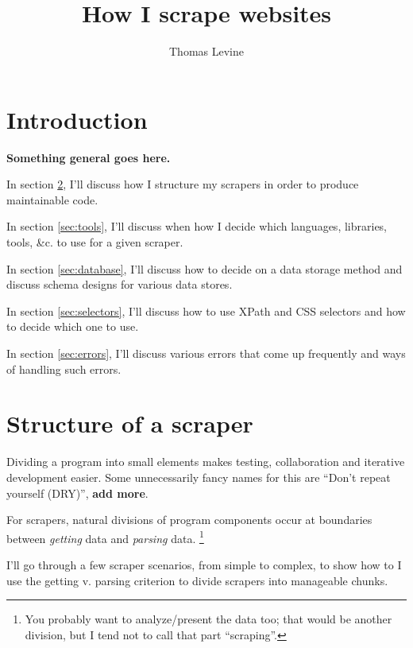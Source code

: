 \documentclass{article}
\title{How I scrape websites}
\author{Thomas Levine}
\newcommand\todo[1]{\textbf{#1}}
\begin{document}
\maketitle
{}
\section{Introduction}
\todo{Something general goes here.}

In section \ref{sec:structure}, I'll discuss how I structure my
scrapers in order to produce maintainable code.

In section \ref{sec:tools}, I'll discuss when how I decide which
languages, libraries, tools, \&c. to use for a given scraper.

In section \ref{sec:database}, I'll discuss how to decide on a data
storage method and discuss schema designs for various data stores.

In section \ref{sec:selectors}, I'll discuss how to use XPath and
CSS selectors and how to decide which one to use.

In section \ref{sec:errors}, I'll discuss various errors that come
up frequently and ways of handling such errors.

\section{Structure of a scraper}\label{sec:structure}
Dividing a program into small elements makes testing, collaboration
and iterative development easier. Some unnecessarily fancy names for
this are ``Don't repeat yourself (DRY)'', \todo{add more}.

For scrapers, natural divisions of program components occur at boundaries
between \emph{getting} data and \emph{parsing} data.
\footnote{You probably want to analyze/present the data too; that would be
another division, but I tend not to call that part ``scraping''.}

I'll go through a few scraper scenarios, from simple to complex, to
show how to I use the getting v. parsing criterion to divide scrapers
into manageable chunks.
\end{document}
